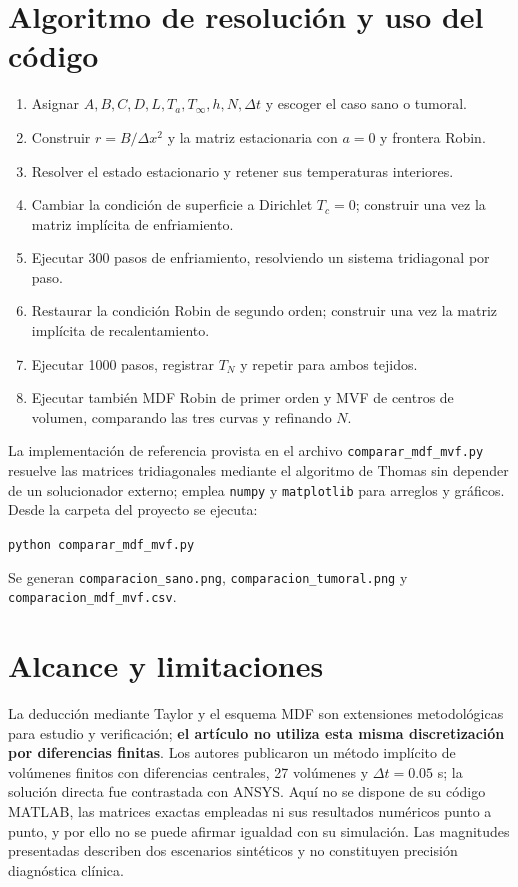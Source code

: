 \documentclass[11pt,a4paper]{article}
\begin{document}
\section{Algoritmo de resolución y uso del código}
\begin{enumerate}[label=\arabic*.]
\item Asignar $A,B,C,D,L,T_a,T_\infty,h,N,\Delta t$ y escoger el caso sano o tumoral.
\item Construir $r=B/\Delta x^2$ y la matriz estacionaria con $a=0$ y frontera Robin.
\item Resolver el estado estacionario y retener sus temperaturas interiores.
\item Cambiar la condición de superficie a Dirichlet $T_c=0$; construir una vez la matriz implícita de enfriamiento.
\item Ejecutar 300 pasos de enfriamiento, resolviendo un sistema tridiagonal por paso.
\item Restaurar la condición Robin de segundo orden; construir una vez la matriz implícita de recalentamiento.
\item Ejecutar 1000 pasos, registrar $T_N$ y repetir para ambos tejidos.
\item Ejecutar también MDF Robin de primer orden y MVF de centros de volumen, comparando las tres curvas y refinando $N$.
\end{enumerate}
La implementación de referencia provista en el archivo \texttt{comparar\_mdf\_mvf.py} resuelve las matrices tridiagonales mediante el algoritmo de Thomas sin depender de un solucionador externo; emplea \texttt{numpy} y \texttt{matplotlib} para arreglos y gráficos. Desde la carpeta del proyecto se ejecuta:
\begin{center}\texttt{python comparar\_mdf\_mvf.py}\end{center}
Se generan \texttt{comparacion\_sano.png}, \texttt{comparacion\_tumoral.png} y \texttt{comparacion\_mdf\_mvf.csv}.

\section{Alcance y limitaciones}
La deducción mediante Taylor y el esquema MDF son extensiones metodológicas para estudio y verificación; \textbf{el artículo no utiliza esta misma discretización por diferencias finitas}. Los autores publicaron un método implícito de volúmenes finitos con diferencias centrales, 27 volúmenes y $\Delta t=0.05$ s; la solución directa fue contrastada con ANSYS. Aquí no se dispone de su código MATLAB, las matrices exactas empleadas ni sus resultados numéricos punto a punto, y por ello no se puede afirmar igualdad con su simulación. Las magnitudes presentadas describen dos escenarios sintéticos y no constituyen precisión diagnóstica clínica.
\end{document}
